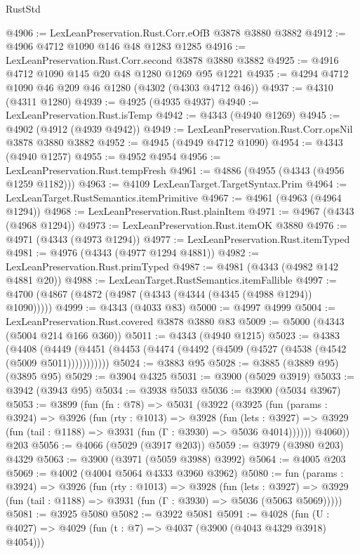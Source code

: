 \begin{lexlean}{RustStd}
\begin{coremodule}
@4906 := LexLeanPreservation.Rust.Corr.eOfB @3878 @3880 @3882
@4912 := @4906 @4712 @1090 @146 @48 @1283 @1285
@4916 := LexLeanPreservation.Rust.Corr.second @3878 @3880 @3882
@4925 := @4916 @4712 @1090 @145 @20 @48 @1280 @1269 @95 @1221
@4935 := @4294 @4712 @1090 @46 @209 @46 @1280 (@4302 (@4303 @4712 @46))
@4937 := @4310 (@4311 @1280)
@4939 := @4925 (@4935 @4937)
@4940 := LexLeanPreservation.Rust.isTemp
@4942 := @4343 (@4940 @1269)
@4945 := @4902 (@4912 (@4939 @4942))
@4949 := LexLeanPreservation.Rust.Corr.opsNil @3878 @3880 @3882
@4952 := @4945 (@4949 @4712 @1090)
@4954 := @4343 (@4940 @1257)
@4955 := @4952 @4954
@4956 := LexLeanPreservation.Rust.tempFresh
@4961 := @4886 (@4955 (@4343 (@4956 @1259 @1182)))
@4963 := @4109 LexLeanTarget.TargetSyntax.Prim
@4964 := LexLeanTarget.RustSemantics.itemPrimitive
@4967 := @4961 (@4963 (@4964 @1294))
@4968 := LexLeanPreservation.Rust.plainItem
@4971 := @4967 (@4343 (@4968 @1294))
@4973 := LexLeanPreservation.Rust.itemOK @3880
@4976 := @4971 (@4343 (@4973 @1294))
@4977 := LexLeanPreservation.Rust.itemTyped
@4981 := @4976 (@4343 (@4977 @1294 @4881))
@4982 := LexLeanPreservation.Rust.primTyped
@4987 := @4981 (@4343 (@4982 @142 @4881 @20))
@4988 := LexLeanTarget.RustSemantics.itemFallible
@4997 := @4700 (@4867 (@4872 (@4987 (@4343 (@4344 (@4345 (@4988 @1294)) @1090)))))
@4999 := @4343 (@4033 @83)
@5000 := @4997 @4999
@5004 := LexLeanPreservation.Rust.covered @3878 @3880 @83
@5009 := @5000 (@4343 (@5004 @214 @166 @360))
@5011 := @4343 (@4940 @1215)
@5023 := @4383
    (@4408 (@4449 (@4451 (@4453 (@4474 (@4492 (@4509 (@4527 (@4538 (@4542 (@5009 @5011)))))))))))
@5024 := @3883 @95
@5028 := @3885 (@3889 @95) (@3895 @95)
@5029 := @3904 @4325
@5031 := @3900 (@5029 @3919)
@5033 := @3942 (@3943 @95)
@5034 := @3938 @5033
@5036 := @3900 (@5034 @3967)
@5053 := @3899
    (fun (fn : @78) =>
    @5031
      (@3922
        (@3925
          (fun (params : @3924) =>
          @3926
            (fun (rty : @1013) =>
            @3928
              (fun (lets : @3927) =>
              @3929 (fun (tail : @1188) => @3931 (fun (Γ : @3930) => @5036 @4014))))))
        @4060))
    @203
@5056 := @4066 (@5029 (@3917 @203))
@5059 := @3979 (@3980 @203) @4329
@5063 := @3900 (@3971 (@5059 @3988) @3992)
@5064 := @4005 @203
@5069 := @4002 (@4004 @5064 @4333 @3960 @3962)
@5080 := fun (params : @3924) =>
  @3926
    (fun (rty : @1013) =>
    @3928
      (fun (lets : @3927) =>
      @3929 (fun (tail : @1188) => @3931 (fun (Γ : @3930) => @5036 (@5063 @5069)))))
@5081 := @3925 @5080
@5082 := @3922 @5081
@5091 := @4028 (fun (U : @4027) => @4029 (fun (t : @7) => @4037 (@3900 (@4043 @4329 @3918) @4054)))

\end{coremodule}
\end{lexlean}
